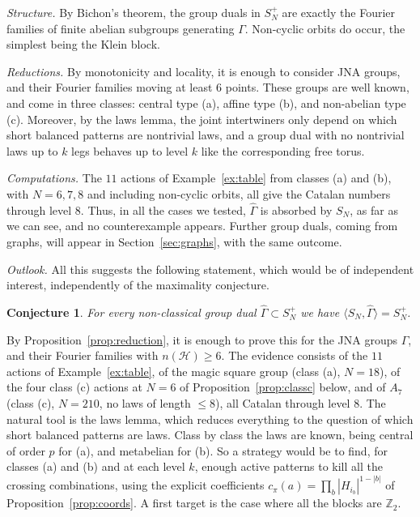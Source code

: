 \documentclass[11pt]{amsart}
\newtheorem{conjecture}[theorem]{Conjecture}
\theoremstyle{definition}
\theoremstyle{remark}
\theoremstyle{plain}
\numberwithin{equation}{section}
\numberwithin{table}{section}
\newcommand{\Z}{\mathbb Z}
\begin{document}
\emph{Structure.} By Bichon's theorem, the group duals in $S_N^+$ are exactly the Fourier families of finite abelian subgroups generating $\Gamma$. Non-cyclic orbits do occur, the simplest being the Klein block.

\emph{Reductions.} By monotonicity and locality, it is enough to consider JNA groups, and their Fourier families moving at least $6$ points. These groups are well known, and come in three classes: central type (a), affine type (b), and non-abelian type (c). Moreover, by the laws lemma, the joint intertwiners only depend on which short balanced patterns are nontrivial laws, and a group dual with no nontrivial laws up to $k$ legs behaves up to level $k$ like the corresponding free torus.

\emph{Computations.} The $11$ actions of Example~\ref{ex:table} from classes (a) and (b), with $N=6,7,8$ and including non-cyclic orbits, all give the Catalan numbers through level $8$. Thus, in all the cases we tested, $\widehat\Gamma$ is absorbed by $S_N$, as far as we can see, and no counterexample appears. Further group duals, coming from graphs, will appear in Section~\ref{sec:graphs}, with the same outcome.

\emph{Outlook.} All this suggests the following statement, which would be of independent interest, independently of the maximality conjecture.

\begin{conjecture}\label{conj:duals}
For every non-classical group dual $\widehat\Gamma\subset S_N^+$ we have $\langle S_N,\widehat\Gamma\rangle=S_N^+$.
\end{conjecture}

By Proposition~\ref{prop:reduction}, it is enough to prove this for the JNA groups $\Gamma$, and their Fourier families with $n(\mathcal H)\ge6$. The evidence consists of the $11$ actions of Example~\ref{ex:table}, of the magic square group (class (a), $N=18$), of the four class (c) actions at $N=6$ of Proposition~\ref{prop:classc} below, and of $A_7$ (class (c), $N=210$, no laws of length $\le8$), all Catalan through level $8$. The natural tool is the laws lemma, which reduces everything to the question of which short balanced patterns are laws. Class by class the laws are known, being central of order $p$ for (a), and metabelian for (b). So a strategy would be to find, for classes (a) and (b) and at each level $k$, enough active patterns to kill all the crossing combinations, using the explicit coefficients $c_\pi(a)=\prod_b|H_{i_b}|^{1-|b|}$ of Proposition~\ref{prop:coords}. A first target is the case where all the blocks are $\Z_2$.
\end{document}
